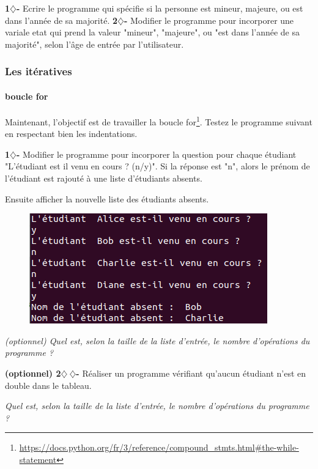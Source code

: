 \begin{tcolorbox}[lefttitle=2cm, colframe=gray!75!black, title= \textbf{Exercices}]
\textbf{1$\diamondsuit$-}
Ecrire le programme qui spécifie si la personne est mineur, majeure, ou est dans l'année de sa majorité.
\textbf{2$\diamondsuit$-}
Modifier le programme pour incorporer une variale etat qui prend la valeur "mineur", "majeure", ou "est dans l'année de sa majorité", selon l'âge de entrée par l'utilisateur.

\end{tcolorbox}


\subsubsection{Les itératives}
\paragraph{boucle for}
Maintenant, l'objectif est de travailler la boucle for\footnote{ \url{https://docs.python.org/fr/3/reference/compound_stmts.html\#the-while-statement}}.
Testez le programme suivant en respectant bien les indentations.


\begin{tcolorbox}[lefttitle=2cm, colframe=gray!75!black, title= \textbf{Exercices}]

\textbf{1$\diamondsuit$-}
Modifier le programme pour incorporer la question pour chaque étudiant "L'étudiant est il venu en cours ? (n/y)".
Si la réponse est "n", alors le prénom de l'étudiant est rajouté à une liste d'étudiants absents.

Ensuite afficher la nouvelle liste des étudiants absents.

\begin{figure}[H]
    \centering
    \includegraphics[scale=0.6]{chapitre1/figures/for.png}
\end{figure}
\textit{(optionnel) Quel est, selon la taille de la liste d'entrée, le nombre d'opérations du programme ?}


\textbf{(optionnel) 2$\diamondsuit~\diamondsuit$-}
Réaliser un programme vérifiant qu'aucun étudiant n'est en double dans le tableau.

\textit{ Quel est, selon la taille de la liste d'entrée, le nombre d'opérations du programme ?}

\end{tcolorbox}

